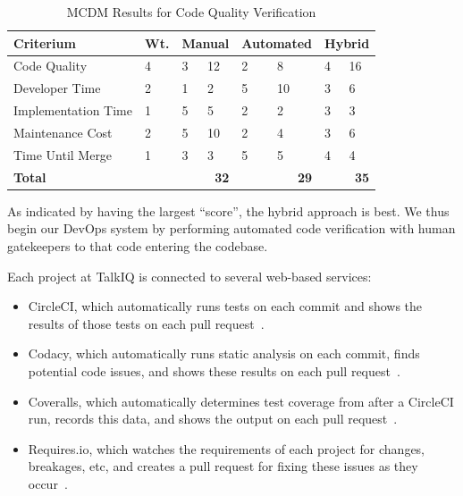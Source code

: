 \documentclass[12pt]{article}
\begin{document}
\begin{table}[ht]
\caption{MCDM Results for Code Quality Verification}
\label{tbl:mcdm-cqv}
\centering
\begin{tabular}{|p{4.0cm}|p{0.65cm}|p{0.5cm}|p{0.5cm}|p{0.8cm}|p{0.8cm}|p{0.45cm}|p{0.45cm}|}
    \hline
    {\bf Criterium} & {\bf Wt.} & \multicolumn{2}{|p{1cm}|}{{\bf Manual}} & \multicolumn{2}{|p{1.6cm}|}{{\bf \mbox{Automated}}} & \multicolumn{2}{|p{0.9cm}|}{{\bf Hybrid}} \\
    \hline
    \hline
    Code Quality        &  4 & 3 & 12 & 2 &  8 & 4 & 16 \\
    Developer Time      &  2 & 1 &  2 & 5 & 10 & 3 &  6 \\
    Implementation Time &  1 & 5 &  5 & 2 &  2 & 3 &  3 \\
    Maintenance Cost    &  2 & 5 & 10 & 2 &  4 & 3 &  6 \\
    Time Until Merge    &  1 & 3 &  3 & 5 &  5 & 4 &  4 \\
    \hline
    \hline
    {\bf Total}         &    & \multicolumn{2}{|r|}{{\bf 32}} & \multicolumn{2}{|r|}{{\bf 29}} & \multicolumn{2}{|r|}{{\bf 35}} \\
    \hline
\end{tabular}
\end{table}

As indicated by having the largest ``score'', the hybrid approach is best. We thus begin our DevOps system by performing automated code verification with human gatekeepers to that code entering the codebase.

Each project at TalkIQ is connected to several web-based services:
\begin{itemize}
\item CircleCI, which automatically runs tests on each commit and shows the results of those tests on each pull request~\cite{circleci}.
\item Codacy, which automatically runs static analysis on each commit, finds potential code issues, and shows these results on each pull request~\cite{codacy}.
\item Coveralls, which automatically determines test coverage from after a CircleCI run, records this data, and shows the output on each pull request~\cite{coveralls}.
\item Requires.io, which watches the requirements of each project for changes, breakages, etc, and creates a pull request for fixing these issues as they occur~\cite{requires}.
\end{itemize}
\end{document}
